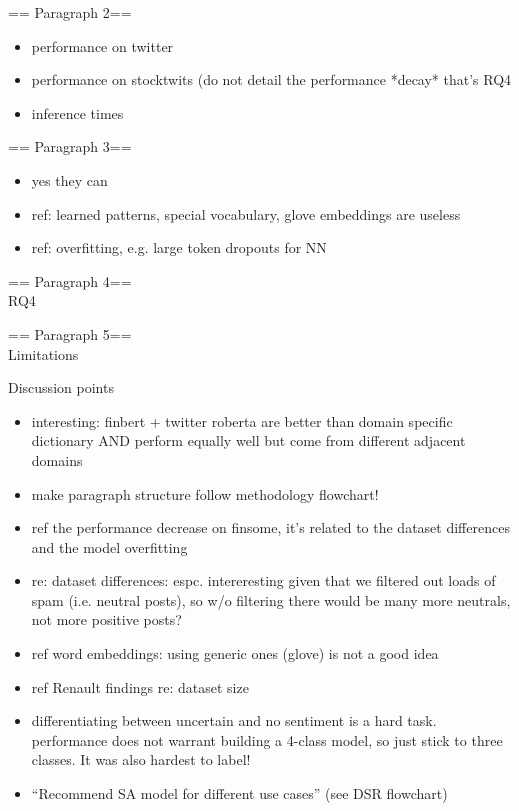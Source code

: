 == Paragraph 2==\\
\begin{itemize}[noitemsep]
	\item performance on twitter
	\item performance on stocktwits (do not detail the performance *decay* that's RQ4
	\item inference times
\end{itemize}


== Paragraph 3==\\
\begin{itemize}[noitemsep]
	\item yes they can
	\item ref: learned patterns, special vocabulary, glove embeddings are useless	
	\item ref: overfitting, e.g. large token dropouts for NN
\end{itemize}



== Paragraph 4==\\
RQ4

== Paragraph 5==\\
Limitations










\newpage
Discussion points
\begin{itemize}[noitemsep]
	\item interesting: finbert + twitter roberta are better than domain specific dictionary AND perform equally well but come from different adjacent domains
	\item make paragraph structure follow methodology flowchart!
	\item ref the performance decrease on finsome, it's related to the dataset differences and the model overfitting
	\item re: dataset differences: espc. intereresting given that we filtered out loads of spam (i.e. neutral posts), so w/o filtering there would be many more neutrals, not more positive posts?
	\item ref word embeddings: using generic ones (glove) is not a good idea
	\item ref Renault findings re: dataset size
	\item differentiating between uncertain and no sentiment is a hard task. performance does not warrant building a 4-class model, so just stick to three classes. It was also hardest to label!
	\item ``Recommend SA model for different use cases'' (see DSR flowchart)
\end{itemize}